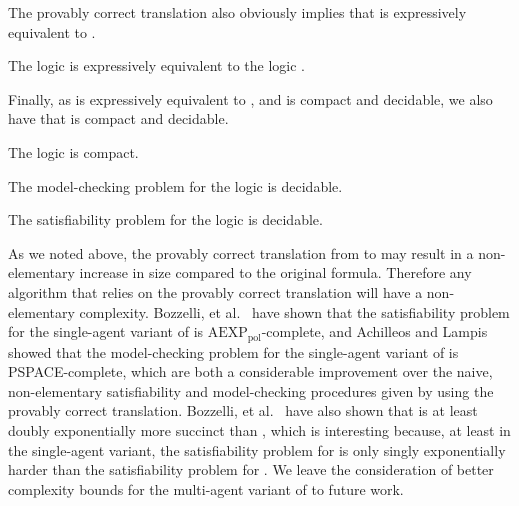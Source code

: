 The provably correct translation also obviously implies that \logicRmlK{} is expressively equivalent to \logicK{}.

\begin{corollary}
The logic \logicRmlK{} is expressively equivalent to the logic \logicK{}.
\end{corollary}

Finally, as \logicRmlK{} is expressively equivalent to \logicK{}, and \logicK{} is compact and decidable, we also have that \logicRmlK{} is compact and decidable.

\begin{corollary}
The logic \logicRmlK{} is compact.
\end{corollary}

\begin{corollary}
The model-checking problem for the logic \logicRmlK{} is decidable.
\end{corollary}

\begin{corollary}
The satisfiability problem for the logic \logicRmlK{} is decidable.
\end{corollary}

As we noted above, the provably correct translation from \langRml{} to \langMl{} may result in a non-elementary increase in size compared to the original formula.
Therefore any algorithm that relies on the provably correct translation will have a non-elementary complexity.
Bozzelli, et al.~\cite{bozzelli:2014a} have shown that the satisfiability problem for the single-agent variant of \logicRmlK{} is $\mathrm{AEXP_{pol}}$-complete, and
Achilleos and Lampis~\cite{achilleos:2013} showed that the model-checking problem for the single-agent variant of \logicRmlK{} is PSPACE-complete,
which are both a considerable improvement over the naive, non-elementary satisfiability and model-checking procedures given by using the provably correct translation.
Bozzelli, et al.~\cite{bozzelli:2014a} have also shown that \logicRmlK{} is at least doubly exponentially more succinct than \logicK{}, which is interesting because, at least in the single-agent variant, the satisfiability problem for \logicRmlK{} is only singly exponentially harder than the satisfiability problem for \logicK{}. 
We leave the consideration of better complexity bounds for the multi-agent variant of \logicRmlK{} to future work.
